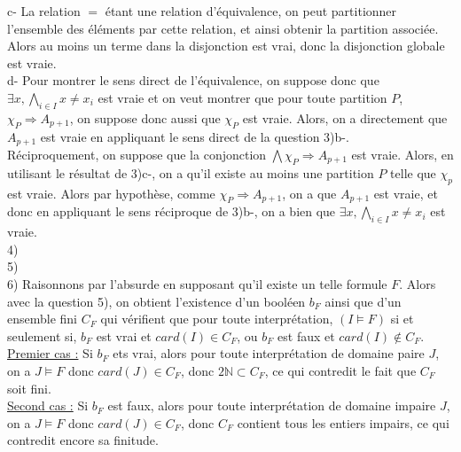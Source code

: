 \documentclass[11pt,a4paper]{article}
\begin{document}
c- La relation $=$ étant une relation d'équivalence, on peut partitionner l'ensemble des éléments par cette relation, et ainsi obtenir la partition associée. Alors au moins un terme dans la disjonction est vrai, donc la disjonction globale est vraie. \\

d- Pour montrer le sens direct de l'équivalence, on suppose donc que $\exists x, \bigwedge_{i \in I} x \neq x_i$ est vraie et on veut montrer que pour toute partition $P$, $\chi_P \Rightarrow A_{p+1}$, on suppose donc aussi que $\chi_P$ est vraie. Alors, on a directement que $A_{p+1}$ est vraie en appliquant le sens direct de la question 3)b-. \\
Réciproquement, on suppose que la conjonction $\bigwedge \chi_P \Rightarrow A_{p+1}$ est vraie. Alors, en utilisant le résultat de 3)c-, on a qu'il existe au moins une partition $P$ telle que $\chi_p$ est vraie. Alors par hypothèse, comme $\chi_P \Rightarrow A_{p+1}$, on a que $A_{p+1}$ est vraie, et donc en appliquant le sens réciproque de 3)b-, on a bien que $\exists x, \bigwedge_{i \in I} x \neq x_i$ est vraie. \\

4) \\

5) \\

6)  Raisonnons par l'absurde en supposant qu'il existe un telle formule $F$. Alors avec la question 5), on obtient l'existence d'un booléen $b_F$ ainsi que d'un ensemble fini $C_F$ qui vérifient que pour toute interprétation, $(I \models F)$ si et seulement si, $b_F$ est vrai et $card(I) \in C_F$, ou $b_F$ est faux et $card(I) \notin C_F$. \\

\underline{Premier cas :} Si $b_F$ ets vrai, alors pour toute interprétation de domaine paire $J$, on a $J \models F$ donc $card(J) \in C_F$, donc $2\mathbb{N} \subset C_F$, ce qui contredit le fait que $C_F$ soit fini. \\

\underline{Second cas :} Si $b_F$ est faux, alors pour toute interprétation de domaine impaire $J$, on a $J \models F$ donc $card(J) \in C_F$, donc $C_F$ contient tous les entiers impairs, ce qui contredit encore sa finitude.
\end{document}
